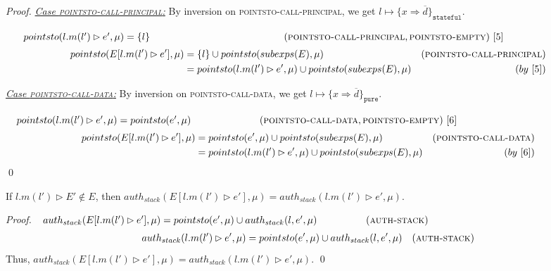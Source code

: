 \documentclass{llncs}
\newcommand{\keywadj}[1]{\mathtt{#1}}
\begin{document}
\begin{proof}
\noindent\underline{\textit{Case \textsc{pointsto-call-principal}:}} By inversion on \textsc{pointsto-call-principal}, we get $l \mapsto \{ x \Rightarrow \overline{d} \}_{\keywadj{stateful}}$.

\noindent$~~~~~pointsto(l.m(l') \rhd e', \mu) = \{ l \}~~~~~~~~~~~~~~~~~~~~~~~~~~~~~~~~~~~~~~~~~(\textsc{pointsto-call-principal}, \textsc{pointsto-empty})~[5]$
\vspace{-7pt}
\begin{align*}
pointsto(E[l.m(l') \rhd e'], \mu) &= \{ l \} \cup pointsto(subexps(E), \mu) & (\textsc{pointsto-call-principal})\\
&= pointsto(l.m(l') \rhd e', \mu) \cup pointsto(subexps(E), \mu) & (by~[5])
\end{align*}

\noindent\underline{\textit{Case \textsc{pointsto-call-data}:}} By inversion on \textsc{pointsto-call-data}, we get $l \mapsto \{ x \Rightarrow \overline{d} \}_{\keywadj{pure}}$.

$~~~pointsto(l.m(l') \rhd e', \mu) = pointsto(e', \mu)~~~~~~~~~~~~~~~~~~~~~(\textsc{pointsto-call-data}, \textsc{pointsto-empty})~[6]$
\vspace{-7pt}
\begin{align*}
pointsto(E[l.m(l') \rhd e'], \mu) &= pointsto(e', \mu) \cup pointsto(subexps(E), \mu) & (\textsc{pointsto-call-data})\\
&= pointsto(l.m(l') \rhd e', \mu) \cup pointsto(subexps(E), \mu) & (by~[6])
\end{align*}
\qed
\end{proof}


\begin{mdframed}
\begin{lemma}
\label{l:simplify-a-stack}
If $l.m(l') \rhd E' \not\in E$, then $auth_{stack}(E[l.m(l') \rhd e'], \mu) = auth_{stack}(l.m(l') \rhd e', \mu)$.
\end{lemma}
\end{mdframed}

\begin{proof} $~~auth_{stack}(E[l.m(l') \rhd e'], \mu) = pointsto(e', \mu) \cup auth_{stack}(l, e', \mu)~~~~~~~~~~~~~~~(\textsc{auth-stack})$
\vspace{-7pt}
\begin{align*}
auth_{stack}(l.m(l') \rhd e', \mu) &= pointsto(e', \mu) \cup auth_{stack}(l, e', \mu)& (\textsc{auth-stack})
\end{align*}
Thus, $auth_{stack}(E[l.m(l') \rhd e'], \mu) = auth_{stack}(l.m(l') \rhd e', \mu)$.
\qed
\end{proof}
\end{document}
